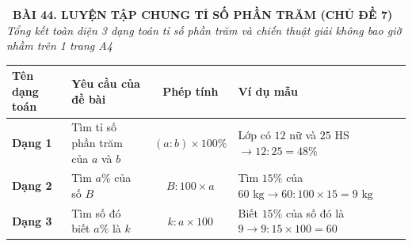 \documentclass[14pt,a4paper,oneside]{extbook}
\begin{document}
\noindent
\begin{tcolorbox}[
  enhanced,
  colback=teal!8!white,
  colframe=teal!80!black,
  arc=3mm,
  boxrule=1.1pt,
  width=\linewidth,
  halign=center,
  top=2.2mm, bottom=2.2mm,
  left=3mm, right=3mm,
  drop fuzzy shadow
]
  {\large\bfseries\color{teal!95!black}\faBookmark\ BÀI 44. LUYỆN TẬP CHUNG TỈ SỐ PHẦN TRĂM (CHỦ ĐỀ 7)}\\[2pt]
  {\scriptsize\color{black!75}\itshape Tổng kết toàn diện 3 dạng toán tỉ số phần trăm và chiến thuật giải không bao giờ nhầm trên 1 trang A4}
\end{tcolorbox}

\vspace{3.2mm}
\noindent
\begin{tcolorbox}[
  enhanced,
  title={\footnotesize\bfseries\color{white}\faTable\ 1. Bảng phân loại 3 bài toán Tỉ số phần trăm kinh điển},
  colback=blue!2!white,
  colframe=blue!75!black,
  arc=2.5mm, boxrule=0.8pt, top=1.8mm, bottom=1.8mm, left=2mm, right=2mm
]
  \scriptsize
  \centering
  \begin{tabular}{|l|l|c|l|}
    \hline
    \textbf{Tên dạng toán} & \textbf{Yêu cầu của đề bài} & \textbf{Phép tính} & \textbf{Ví dụ mẫu} \\ \hline
    \textbf{Dạng 1} & Tìm tỉ số phần trăm của $a$ và $b$ & $(a : b) \times 100\%$ & Lớp có $12$ nữ và $25$ HS $\rightarrow 12 : 25 = 48\%$ \\ \hline
    \textbf{Dạng 2} & Tìm $a\%$ của số $B$ & $B : 100 \times a$ & Tìm $15\%$ của $60\text{ kg} \rightarrow 60 : 100 \times 15 = 9\text{ kg}$ \\ \hline
    \textbf{Dạng 3} & Tìm số đó biết $a\%$ là $k$ & $k : a \times 100$ & Biết $15\%$ của số đó là $9 \rightarrow 9 : 15 \times 100 = 60$ \\ \hline
  \end{tabular}
\end{tcolorbox}

\vspace{3mm}
\end{document}
